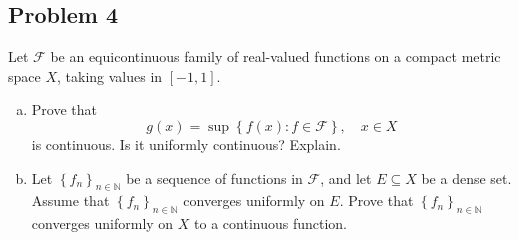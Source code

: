 \documentclass[12pt]{article}
\newcommand{\n}{\mathbb{N}}
\newcommand\setb[1]{\left \{ #1 \right \}}
\theoremstyle{definition}
\begin{document}
\subsection{Problem 4 \texorpdfstring{\cite{Rudin,Evan}}{}}
Let $\mathcal{F}$ be an equicontinuous family of real-valued functions on a compact metric space $X$, taking values in $[-1,1]$. 
\begin{enumerate}[(a)]
    \item Prove that 
    \[
        g(x) = \sup \setb{ f(x) : f \in \mathcal{F} } , \quad x \in X
    \]
    is continuous. Is it uniformly continuous? Explain. 
    \item Let $\setb{ f_n }_{n \in \n}$ be a sequence of functions in $\mathcal{F}$, and let $E \subseteq X$ be a dense set. Assume that $\setb{ f_n }_{n \in \n}$ converges uniformly on $E$. Prove that $\setb{ f_n }_{n \in \n}$ converges uniformly on $X$ to a continuous function. 
\end{enumerate}
\end{document}
